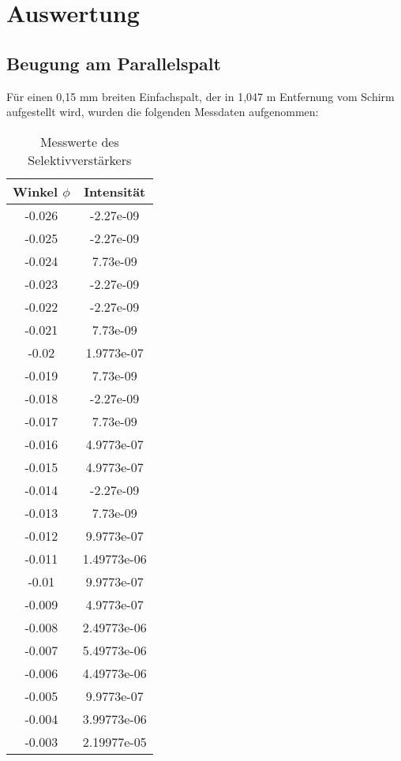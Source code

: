 \section{Auswertung}
\label{sec:Auswertung}

\subsection{Beugung am Parallelspalt}
  Für einen 0,15 mm breiten Einfachspalt, der in 1,047 m Entfernung vom Schirm aufgestellt
  wird, wurden die folgenden Messdaten aufgenommen:
  \begin{table}[H]
  \centering
  \caption{Messwerte des Selektivverstärkers}
  \label{tab:mag}
  \begin{tabular}{c c}
   \toprule
    Winkel $\phi$ & Intensität\\
   \midrule
   -0.026     & -2.27e-09    \\
 -0.025       & -2.27e-09    \\
 -0.024       &  7.73e-09    \\
 -0.023       & -2.27e-09    \\
 -0.022       & -2.27e-09    \\
 -0.021       &  7.73e-09    \\
 -0.02        &  1.9773e-07  \\
 -0.019       &  7.73e-09    \\
 -0.018       & -2.27e-09    \\
 -0.017       &  7.73e-09    \\
 -0.016       &  4.9773e-07  \\
 -0.015       &  4.9773e-07  \\
 -0.014       & -2.27e-09    \\
 -0.013       &  7.73e-09    \\
 -0.012       &  9.9773e-07  \\
 -0.011       &  1.49773e-06 \\
 -0.01        &  9.9773e-07  \\
 -0.009       &  4.9773e-07  \\
 -0.008       &  2.49773e-06 \\
 -0.007       &  5.49773e-06 \\
 -0.006       &  4.49773e-06 \\
 -0.005       &  9.9773e-07  \\
 -0.004       &  3.99773e-06 \\
 -0.003       &  2.19977e-05 \\

\end{tabular}
\end{table}
